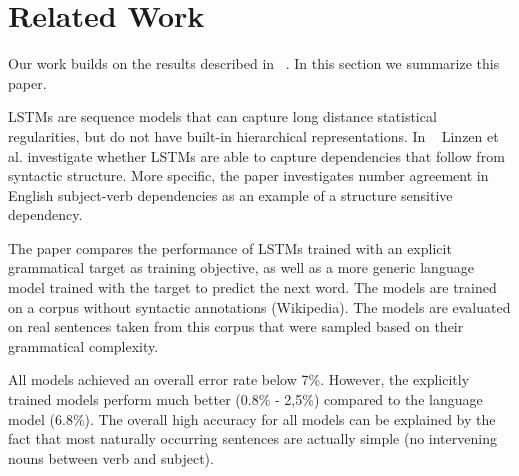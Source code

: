 \section{Related Work}
\label{related work}


Our work builds on the results described in ~\citep{Linzen2016}. In this section 
we summarize this paper. 

LSTMs are sequence models that can capture long distance statistical regularities,
but do not have built-in hierarchical representations.
In ~\citep{Linzen2016} Linzen et al. investigate whether LSTMs are able to capture
dependencies that follow from syntactic structure. More specific,
the paper investigates number agreement in English subject-verb dependencies
as an example of a structure sensitive dependency.



The paper compares the performance of LSTMs
trained with an explicit grammatical target as training objective,
as well as a more generic language model trained with the target to
predict the next word. 
The models are trained on a corpus without syntactic annotations (Wikipedia).
The models are evaluated on real sentences taken from this corpus
that were sampled based on their grammatical complexity. 


  
All models achieved an overall error rate below 7\%. However,
the explicitly trained models perform much better (0.8\% - 2,5\%)
compared to the language model (6.8\%). 
The overall high accuracy for all models can be explained by
the fact that most naturally occurring sentences are actually
simple (no intervening nouns between verb and subject).

